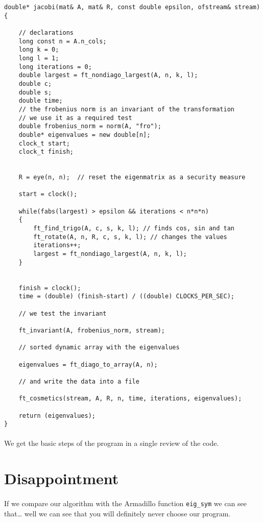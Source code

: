 \documentclass[a4paper, twoside, 11pt]{report}
\theoremstyle{theorem}
\theoremstyle{remark}
\theoremstyle{exemple}
\begin{document}
			\begin{lstlisting}
double* jacobi(mat& A, mat& R, const double epsilon, ofstream& stream)
{

    // declarations
    long const n = A.n_cols;
    long k = 0;
    long l = 1;
    long iterations = 0;
    double largest = ft_nondiago_largest(A, n, k, l);
    double c;
    double s;
    double time;
    // the frobenius norm is an invariant of the transformation
    // we use it as a required test
    double frobenius_norm = norm(A, "fro");
    double* eigenvalues = new double[n];
    clock_t start;
    clock_t finish;


    R = eye(n, n);  // reset the eigenmatrix as a security measure
    
    start = clock();
    
    while(fabs(largest) > epsilon && iterations < n*n*n)
    {
        ft_find_trigo(A, c, s, k, l); // finds cos, sin and tan
        ft_rotate(A, n, R, c, s, k, l); // changes the values
        iterations++;
        largest = ft_nondiago_largest(A, n, k, l);
    }
    
    
    finish = clock();
    time = (double) (finish-start) / ((double) CLOCKS_PER_SEC);
    
    // we test the invariant
    
    ft_invariant(A, frobenius_norm, stream);
    
    // sorted dynamic array with the eigenvalues
    
    eigenvalues = ft_diago_to_array(A, n);
    
    // and write the data into a file
    
    ft_cosmetics(stream, A, R, n, time, iterations, eigenvalues);
    
    return (eigenvalues);
}

\end{lstlisting}
				
			\paragraph{}We get the basic steps of the program in a single review of the code.

    
    \section{Disappointment}
    
    	\paragraph{}If we compare our algorithm with the Armadillo function \texttt{eig\_sym} we can see that… well we can see that you will definitely never choose our program.  
\end{document}
